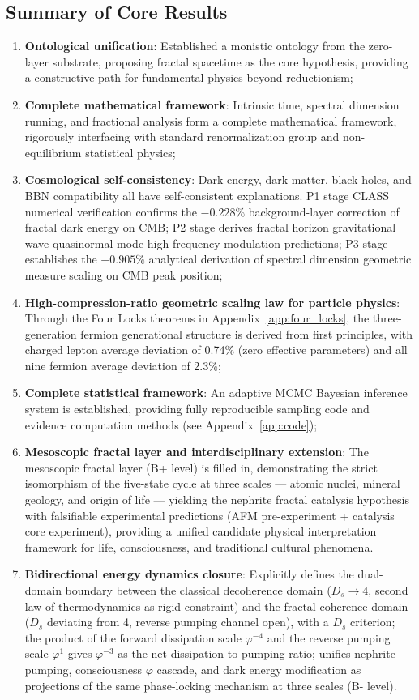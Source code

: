 \documentclass[12pt,a4paper,twocolumn]{article}
\renewcommand{\phi}{\varphi}
\begin{document}
\subsection{Summary of Core Results}
\begin{enumerate}
\item \textbf{Ontological unification}: Established a monistic ontology from the zero-layer substrate, proposing fractal spacetime as the core hypothesis, providing a constructive path for fundamental physics beyond reductionism;
\item \textbf{Complete mathematical framework}: Intrinsic time, spectral dimension running, and fractional analysis form a complete mathematical framework, rigorously interfacing with standard renormalization group and non-equilibrium statistical physics;
\item \textbf{Cosmological self-consistency}: Dark energy, dark matter, black holes, and BBN compatibility all have self-consistent explanations. P1 stage CLASS numerical verification confirms the $-0.228\%$ background-layer correction of fractal dark energy on CMB; P2 stage derives fractal horizon gravitational wave quasinormal mode high-frequency modulation predictions; P3 stage establishes the $-0.905\%$ analytical derivation of spectral dimension geometric measure scaling on CMB peak position;
\item \textbf{High-compression-ratio geometric scaling law for particle physics}: Through the Four Locks theorems in Appendix~\ref{app:four_locks}, the three-generation fermion generational structure is derived from first principles, with charged lepton average deviation of 0.74\% (zero effective parameters) and all nine fermion average deviation of 2.3\%;
\item \textbf{Complete statistical framework}: An adaptive MCMC Bayesian inference system is established, providing fully reproducible sampling code and evidence computation methods (see Appendix~\ref{app:code});
\item \textbf{Mesoscopic fractal layer and interdisciplinary extension}: The mesoscopic fractal layer (B+ level) is filled in, demonstrating the strict isomorphism of the five-state cycle at three scales --- atomic nuclei, mineral geology, and origin of life --- yielding the nephrite fractal catalysis hypothesis with falsifiable experimental predictions (AFM pre-experiment + catalysis core experiment), providing a unified candidate physical interpretation framework for life, consciousness, and traditional cultural phenomena.
\item \textbf{Bidirectional energy dynamics closure}: Explicitly defines the dual-domain boundary between the classical decoherence domain ($D_s\to 4$, second law of thermodynamics as rigid constraint) and the fractal coherence domain ($D_s$ deviating from 4, reverse pumping channel open), with a $D_s$ criterion; the product of the forward dissipation scale $\phi^{-4}$ and the reverse pumping scale $\phi^{1}$ gives $\phi^{-3}$ as the net dissipation-to-pumping ratio; unifies nephrite pumping, consciousness $\phi$ cascade, and dark energy modification as projections of the same phase-locking mechanism at three scales (B- level).
\end{enumerate}
\end{document}
